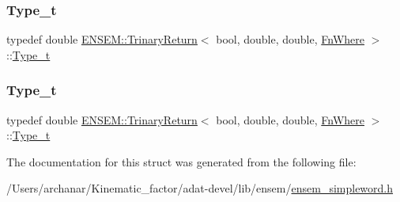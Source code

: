 \mbox{\label{structENSEM_1_1TrinaryReturn_3_01bool_00_01double_00_01double_00_01FnWhere_01_4_a9a6eb2e23b53eb2cd6021511101cd3a1}} 
\subsubsection{\texorpdfstring{Type\_t}{Type\_t}\hspace{0.1cm}{\footnotesize\ttfamily [2/3]}}
{\footnotesize\ttfamily typedef double \mbox{\hyperlink{structENSEM_1_1TrinaryReturn}{E\+N\+S\+E\+M\+::\+Trinary\+Return}}$<$ bool, double, double, \mbox{\hyperlink{structENSEM_1_1FnWhere}{Fn\+Where}} $>$\+::\mbox{\hyperlink{structENSEM_1_1TrinaryReturn_3_01bool_00_01double_00_01double_00_01FnWhere_01_4_a9a6eb2e23b53eb2cd6021511101cd3a1}{Type\+\_\+t}}}

\mbox{\label{structENSEM_1_1TrinaryReturn_3_01bool_00_01double_00_01double_00_01FnWhere_01_4_a9a6eb2e23b53eb2cd6021511101cd3a1}} 
\subsubsection{\texorpdfstring{Type\_t}{Type\_t}\hspace{0.1cm}{\footnotesize\ttfamily [3/3]}}
{\footnotesize\ttfamily typedef double \mbox{\hyperlink{structENSEM_1_1TrinaryReturn}{E\+N\+S\+E\+M\+::\+Trinary\+Return}}$<$ bool, double, double, \mbox{\hyperlink{structENSEM_1_1FnWhere}{Fn\+Where}} $>$\+::\mbox{\hyperlink{structENSEM_1_1TrinaryReturn_3_01bool_00_01double_00_01double_00_01FnWhere_01_4_a9a6eb2e23b53eb2cd6021511101cd3a1}{Type\+\_\+t}}}



The documentation for this struct was generated from the following file\+:\begin{DoxyCompactItemize}
\item 
/\+Users/archanar/\+Kinematic\+\_\+factor/adat-\/devel/lib/ensem/\mbox{\hyperlink{adat-devel_2lib_2ensem_2ensem__simpleword_8h}{ensem\+\_\+simpleword.\+h}}\end{DoxyCompactItemize}
